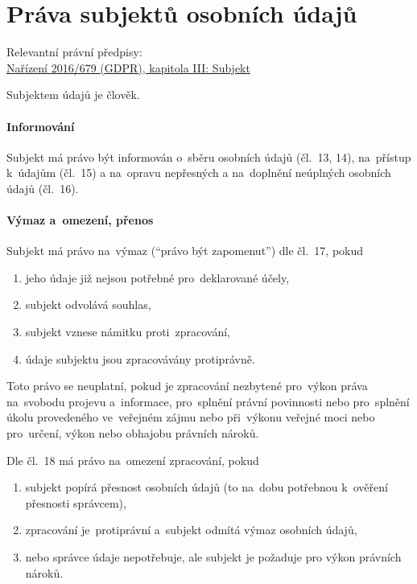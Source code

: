 \clearpage
\section{Práva subjektů osobních údajů}

{}Relevantní právní předpisy:
\\\href{https://eur-lex.europa.eu/legal-content/CS/ALL/?uri=CELEX:32016R0679#d1e2150-1-1
}{Nařízení 2016/679 (GDPR), kapitola III: Subjekt}

Subjektem údajů je člověk.


\paragraph{Informování}

Subjekt má právo být informován o~sběru osobních údajů (čl.~13, 14), na~přístup k~údajům (čl.~15) a na~opravu nepřesných a na~doplnění neúplných osobních údajů (čl.~16).


\paragraph{Výmaz a~omezení, přenos}

Subjekt má právo na~výmaz (\enquote{právo být zapomenut}) dle čl.~17, pokud

\begin{enumerate}[label=\alph*)]
\item jeho údaje již nejsou potřebné pro~deklarované účely,
\item subjekt odvolává souhlas,
\item subjekt vznese námitku proti~zpracování,
\item údaje subjektu jsou zpracovávány protiprávně.
\end{enumerate}

Toto právo se neuplatní, pokud je zpracování nezbytené pro~výkon práva na~svobodu projevu a~informace, pro~splnění právní povinnosti nebo pro~splnění úkolu provedeného ve~veřejném zájmu nebo při~výkonu veřejné moci nebo pro~určení, výkon nebo obhajobu právních nároků.

Dle čl.~18 má právo na~omezení zpracování, pokud

\begin{enumerate}[label=\alph*)]
\item subjekt popírá přesnost osobních údajů (to na~dobu potřebnou k~ověření přesnosti správcem),
\item zpracování je~protiprávní a~subjekt odmítá výmaz osobních údajů,
\item nebo správce údaje nepotřebuje, ale subjekt je požaduje pro výkon právních nároků.
\end{enumerate}

